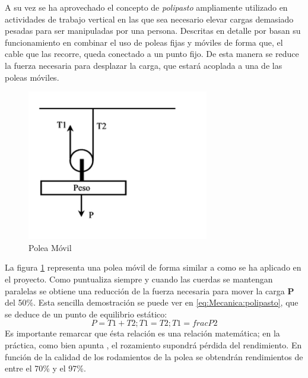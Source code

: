     A su vez se ha aprovechado el concepto de \textit{polipasto} ampliamente utilizado en actividades de trabajo vertical en las que sea necesario elevar cargas demasiado pesadas para ser manipuladas por una persona. Descritas en detalle por \cite{granvertical} basan su funcionamiento en combinar el uso de poleas fijas y móviles de forma que, el cable que las recorre, queda conectado a un punto fijo. De esta manera se reduce la fuerza necesaria para desplazar la carga, que estará acoplada a una de las poleas móviles.

    \begin{minipage}{0.30\textwidth}
        \begin{figure}[H]
            \centering
            \includegraphics[width=\textwidth]{figuras/Imagenes_Mecanica/pmovil.png}
            \caption{Polea Móvil}
            \label{fig:Mecanica:pmovil}
        \end{figure}
    \end{minipage}
    \begin{minipage}{0.60\textwidth}\raggedright

        La figura \ref{fig:Mecanica:pmovil} representa una polea móvil de forma similar a como se ha aplicado en el proyecto. Como puntualiza \cite{granvertical} siempre y cuando las cuerdas se mantengan paralelas se obtiene una reducción de la fuerza necesaria para mover la carga \textbf{P} del 50\%. Esta sencilla demostración se puede ver en \ref{eq:Mecanica:polipasto}, que se deduce de un punto de equilibrio estático:
        \begin{equation}
            \label{eq:Mecanica:polipasto}
            P = T1 + T2 ; T1 = T2 ; T1 = frac{P}{2}
        \end{equation}
        Es importante remarcar que ésta relación es una relación matemática; en la práctica, como bien apunta \cite{granvertical}, el rozamiento supondrá pérdida del rendimiento. En función de la calidad de los rodamientos de la polea se obtendrán rendimientos de entre el 70\% y el 97\%.
    \end{minipage}

